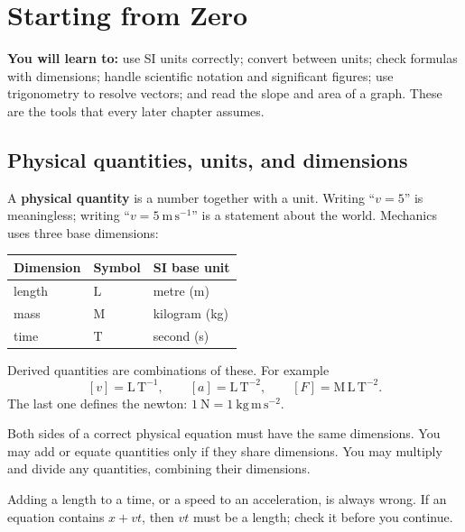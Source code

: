 \chapter{Starting from Zero}
\label{ch:zero}
\begin{chapterintro}
\textbf{You will learn to:} use SI units correctly; convert between units; check
formulas with dimensions; handle scientific notation and significant figures; use
trigonometry to resolve vectors; and read the slope and area of a graph. These are
the tools that every later chapter assumes.
\end{chapterintro}

\section{Physical quantities, units, and dimensions}

A \textbf{physical quantity} is a number together with a unit. Writing
``$v=5$'' is meaningless; writing ``$v=5\ \mathrm{m\,s^{-1}}$'' is a statement
about the world. Mechanics uses three base dimensions:

\begin{center}
\renewcommand{\arraystretch}{1.2}
\begin{tabular}{@{}lll@{}}
\toprule
\textbf{Dimension} & \textbf{Symbol} & \textbf{SI base unit} \\
\midrule
length & $\mathrm{L}$ & metre (m) \\
mass & $\mathrm{M}$ & kilogram (kg) \\
time & $\mathrm{T}$ & second (s) \\
\bottomrule
\end{tabular}
\end{center}

Derived quantities are combinations of these. For example
\[
[v]=\mathrm{L\,T^{-1}},\qquad
[a]=\mathrm{L\,T^{-2}},\qquad
[F]=\mathrm{M\,L\,T^{-2}}.
\]
The last one defines the newton: $1\ \mathrm{N}=1\ \mathrm{kg\,m\,s^{-2}}$.

\begin{keyidea}
Both sides of a correct physical equation must have the same dimensions. You may
add or equate quantities only if they share dimensions. You may multiply and
divide any quantities, combining their dimensions.
\end{keyidea}

\begin{warning}
Adding a length to a time, or a speed to an acceleration, is always wrong. If an
equation contains $x+vt$, then $vt$ must be a length; check it before you
continue.
\end{warning}


